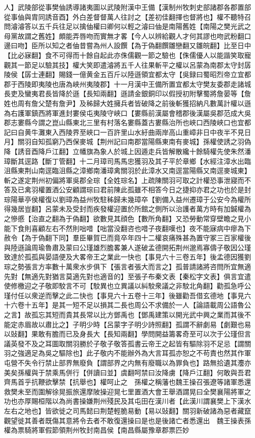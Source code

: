 人】武陵部從事樊伷誘導諸夷圖以武陵附漢中王備【漢制州牧刺史部諸郡各郡置部從事伷與胄同誘音酉】外白差督督萬人往討之【差初佳翻擇也督將也】權不聽特召問濬濬答以五千兵往足以擒伷權曰卿何以輕之濬曰伷是南陽舊姓【南陽之樊光武之母黨故謂之舊姓】頗能弄唇吻而實無才畧【今人以辨給觀人才何其謬也吻武粉翻口邊曰吻】臣所以知之者伷昔嘗為州人設饌【為于偽翻饌雛戀翻又雛皖翻】比至日中【比必寐翻】食不可得而十餘自起此亦侏儒觀一節之驗也【侏儒優人以能諧笑取寵觀其一節足以驗其技】權大笑即遣濬將五千人往果斬平之權以呂蒙為南郡太守封孱陵侯【孱士連翻】賜錢一億黄金五百斤以陸遜領宜都太守【吳録曰蜀昭烈帝立宜都郡于西陵即夷陵也唐為峽州夷陵郡】十一月漢中王備所置宜都太守樊友委郡走諸城長吏及蠻夷君長皆降於遜【長知兩翻】遜請金銀銅印以假授初附擊蜀將詹晏等【詹姓也周有詹父楚有詹尹】及秭歸大姓擁兵者皆破降之前後斬獲招納凡數萬計權以遜為右護軍鎮西將軍進封婁侯屯夷陵守峽口【婁縣前漢屬會稽郡後漢屬吳郡范成大吳郡志婁縣今謂之崑山縣東北三里有村落名婁縣蓋古婁縣治所也峽口西陵峽口也宜都記曰自黄牛灘東入西陵界至峽口一百許里山水紆曲兩岸高山重嶂非日中夜半不見日月】關羽自知孤窮乃西保麥城【荆州記曰南郡當陽縣東南有麥城】孫權使誘之羽偽降【誘音酉降戶江翻】立幡旗為象人於城上因遁走兵皆解散纔十餘騎權先使朱然潘璋斷其逕路【斷丁管翻】十二月璋司馬馬忠獲羽及其子平於章鄉【水經注漳水出臨沮縣東荆山南逕臨沮縣之漳鄉南潘璋禽關羽於此漳水又南逕當陽縣又南逕麥城東】斬之遂定荆州初偏將軍吳郡全琮【全姓琮名】上疏陳關羽可取之計權恐事泄寢而不答及已禽羽權置酒公安顧謂琮曰君前陳此孤雖不相答今日之捷抑亦君之功也於是封琮陽華亭侯權復以劉璋為益州牧駐秭歸未幾璋卒【劉備入益州遷璋于公安今為權所得幾居豈翻】呂蒙未及受封而疾發權迎置於所館之側所以治護者萬方時有加鍼權為之慘慼【治直之翻為于偽翻】欲數見其顔色【數所角翻】又恐勞動常穿壁瞻之見小能下食則喜顧左右不然則咄唶【咄當没翻咨也唶子夜翻嘆也】夜不能寐病中瘳為下赦令【為于偽翻下同】羣臣畢賀已而竟卒年四十二權哀痛殊甚為置守冢三百家權後與陸遜論周瑜魯肅及蒙曰公瑾雄烈膽畧兼人遂破孟德開拓荆州邈焉寡儔子敬因公瑾致達於孤孤與晏語便及大畧帝王之業此一快也【事見六十三卷五年】後孟德因獲劉琮之勢張言方率數十萬衆水步俱下【張言者張大而言之】孤普請諸將咨問所宜無適先對【無適先對猶言莫適先對也適音的】至張子布秦文表【秦松字文表】俱言宜遣使修檄迎之子敬即駮言不可【駮異也立異議以糾駮衆議之非駮北角翻】勸孤急呼公瑾付任以衆逆而擊之此二快也【事見六十五卷十三年】後雖勸吾借玄德地【事見六十六卷十五年】是其一短不足以損其二長也周公不求備於一人【論語載周公語魯公之言】故孤忘其短而貴其長常以比方鄧禹也【鄧禹建策以開光武中興之業而其後不能定赤眉故以肅比之】子明少時【呂蒙字子明少詩照翻】孤謂不辭劇易【劇艱也易以䜴翻】果敢有膽而已及身長大【長知兩翻】學問開益籌畧奇至可以次于公瑾但言議英發不及之耳圖取關羽勝於子敬子敬答孤書云帝王之起皆有驅除羽不足忌【謂關羽之強適足為吳之驅除也】此子敬内不能辦外為大言耳孤亦恕之不苟責也然其作軍屯營不失令行禁止部界無廢負【謂部界之内無有廢職以為罪負也】路無拾遺其灋亦美矣孫權與于禁乘馬併行【併讀曰並】虞翻呵禁曰汝降虜【降戶江翻】何敢與吾君齊馬首乎抗鞭欲擊禁【抗舉也】權呵止之　孫權之稱藩也魏王操召張遼等諸軍悉還救樊未至而圍解徐晃振旅還摩陂操迎晃七里置酒大會王舉酒謂晃曰全樊襄陽將軍之功也亦厚賜桓階以為尚書操嫌荆州殘民及其屯田在漢川者【此漢川謂襄樊上下漢水左右之地也】皆欲徙之司馬懿曰荆楚輕脆易動【易以䜴翻】關羽新破諸為惡者藏竄觀望徙其善者既傷其意將令去者不敢復還操曰是也是後諸亡者悉還出　魏王操表孫權為票騎將軍假節領荆州牧封南昌侯【南昌縣屬豫章郡票匹妙